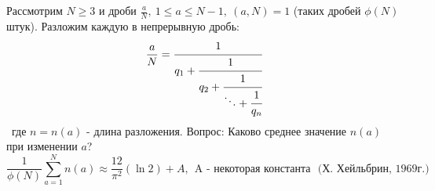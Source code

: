     \begin{comm}
        Рассмотрим $N\geq 3$ и дроби $\frac{a}{N},\ 1\leq a\leq N-1,\ (a,N)=1$ (таких дробей $\phi(N)$ штук). Разложим каждую в непрерывную дробь:
        \[\frac{a}{N}=\cfrac{1}{q_1+\cfrac{1}{q_2+\cfrac{1}{\ddots+\cfrac{1}{q_n}}}}\]\
        где $n=n(a)$ - длина разложения.
        Вопрос: Каково среднее значение $n(a)$ при изменении $a$?
        \[\frac{1}{\phi(N)}\sum\limits_{a=1}^N n(a)\approx \frac{12}{\pi^2}(\ln{2})+A,\ \ \text{A - некоторая константа}\ \ \ \text{(Х. Хейльбрин, 1969г.)}\]
    \end{comm}